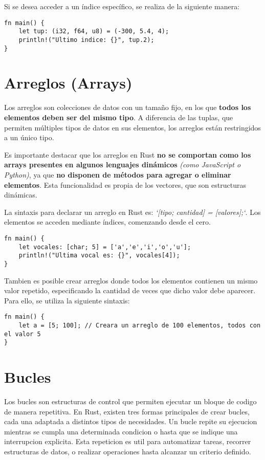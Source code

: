\documentclass[12pt]{article}
\begin{document}
Si se desea acceder a un índice específico, se realiza de la siguiente manera:

\begin{lstlisting}[style=ruststyle]
fn main() {
	let tup: (i32, f64, u8) = (-300, 5.4, 4);
	println!("Ultimo indice: {}", tup.2);
}
\end{lstlisting}

\section{Arreglos (Arrays)}
Los arreglos son colecciones de datos con un tamaño fijo, en los que \textbf{todos los elementos deben ser del mismo tipo}. A diferencia de las tuplas, que permiten múltiples tipos de datos en sus elementos, los arreglos están restringidos a un único tipo.

Es importante destacar que los arreglos en Rust \textbf{no se comportan como los arrays presentes en algunos lenguajes dinámicos} \textit{(como JavaScript o Python)}, ya que \textbf{no disponen de métodos para agregar o eliminar elementos}. Esta funcionalidad es propia de los vectores, que son estructuras dinámicas.\linebreak

La sintaxis para declarar un arreglo en Rust es: \textit{`[tipo; cantidad] = [valores];`}. Los elementos se acceden mediante índices, comenzando desde el cero.

\begin{lstlisting}[style=ruststyle]
fn main() {
	let vocales: [char; 5] = ['a','e','i','o','u'];
	println!("Ultima vocal es: {}", vocales[4]);
}
\end{lstlisting}

Tambien es posible crear arreglos donde todos los elementos contienen un mismo valor repetido, especificando la cantidad de veces que dicho valor debe aparecer. Para ello, se utiliza la siguiente sintaxis:

\begin{lstlisting}[style=ruststyle]
fn main() {
	let a = [5; 100]; // Creara un arreglo de 100 elementos, todos con el valor 5
}
\end{lstlisting}



\section{Bucles}
Los bucles son estructuras de control que permiten ejecutar un bloque de codigo de manera repetitiva. En Rust, existen tres formas principales de crear bucles, cada una adaptada a distintos tipos de necesidades. Un bucle repite su ejecucion mientras se cumpla una determinada condicion o hasta que se indique una interrupcion explicita. Esta repeticion es util para automatizar tareas, recorrer estructuras de datos, o realizar operaciones hasta alcanzar un criterio definido.
\end{document}
